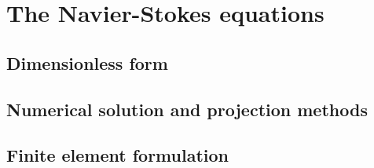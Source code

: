 \chapter{The Navier-Stokes equations}

\section{Dimensionless form}
\section{Numerical solution and projection methods}
\section{Finite element formulation}
